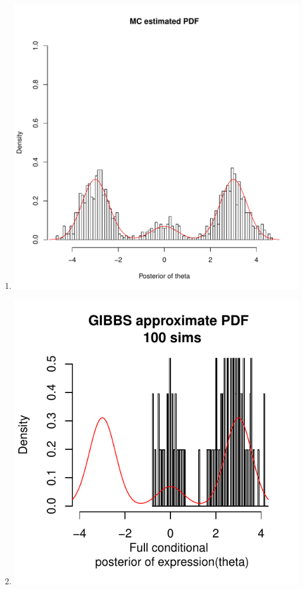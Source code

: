 \documentclass{article}\usepackage[]{graphicx}\usepackage[]{color}
\makeatletter
\def\maxwidth{ %
  \ifdim\Gin@nat@width>\linewidth
    \linewidth
  \else
    \Gin@nat@width
  \fi
}
\newenvironment{knitrout}{}{} %
\makeatother
\begin{document}
\begin{enumerate}
\item%

\begin{knitrout}
\color{fgcolor}
\includegraphics[width=\maxwidth]{figure/prob1-1} 

\end{knitrout}

\item %


\includegraphics[width=\maxwidth]{figure/prob2-1} 


\end{enumerate}
\end{document}
